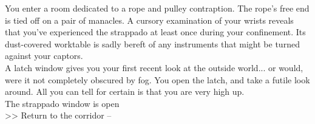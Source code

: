 You enter a room dedicated to a rope and pulley contraption. The rope’s free end is tied off on a pair of manacles. A cursory examination of your wrists reveals that you’ve experienced the strappado at least once during your confinement. Its dust-covered worktable is sadly bereft of any instruments that might be turned against your captors.\\

A latch window gives you your first recent look at the outside world... or would, were it not completely obscured by fog. You open the latch, and take a futile look around. All you can tell for certain is that you are very high up.\\

 The strappado window is open\\
>> Return to the corridor -- 